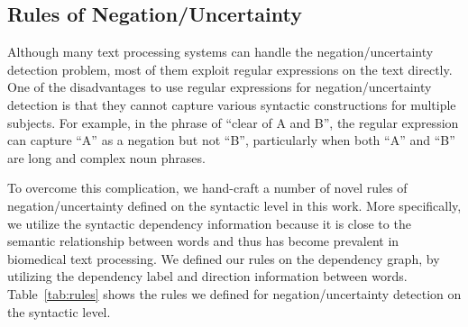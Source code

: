 \documentclass[10pt,twocolumn,letterpaper]{article}
\begin{document}
\subsection{Rules of Negation/Uncertainty}
Although many text processing systems can handle the negation/uncertainty detection problem, most of them exploit regular expressions on the text directly. One of the disadvantages to use regular expressions for negation/uncertainty detection is that they cannot capture various syntactic constructions for multiple subjects. For example, in the phrase of ``clear of A and B'', the regular expression can capture ``A'' as a negation but not ``B'', particularly when both ``A'' and ``B'' are long and complex noun phrases. 

To overcome this complication, we hand-craft a number of novel rules of negation/uncertainty defined on the syntactic level in this work. More specifically, we utilize the syntactic dependency information because it is close to the semantic relationship between words and thus has become prevalent in biomedical text processing. We defined our rules on the dependency graph, by utilizing the dependency label and direction information between words. Table~\ref{tab:rules} shows the rules we  defined  for negation/uncertainty detection on the syntactic level.
\end{document}
